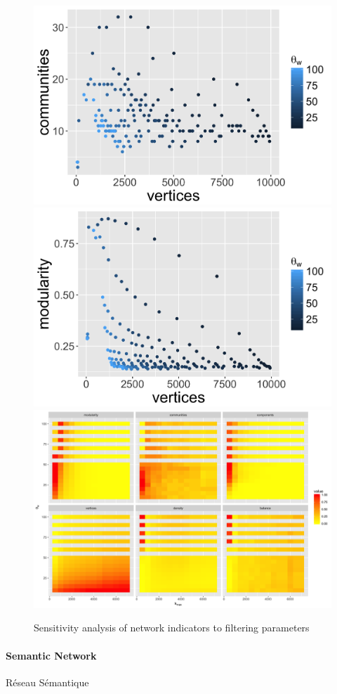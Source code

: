 \begin{figure}
\includegraphics[width=0.49\linewidth]{Figures/Quantepistemo/pareto-com-vertices}
\includegraphics[width=0.49\linewidth]{Figures/Quantepistemo/pareto-modularity-vertices}\\
\includegraphics[width=\linewidth]{Figures/Quantepistemo/sensitivity_freqmin0_normalized}
\caption{Sensitivity analysis of network indicators to filtering parameters}
\label{fig:app:quantepistemo:sensitivity}
\end{figure}



\paragraph{Semantic Network}{Réseau Sémantique}

